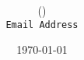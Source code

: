\documentclass[11pt,twocolumn]{report}
\title{\subjectcode{} \doctitle{}\\\large{\institution{}}}
\author{\name{} (\studentnumber{}) \\
\texttt{Email Address}}
\date{\today}
\begin{document}
\maketitle

\begin{abstract}

\lipsum[1]

\end{abstract}


 

\onecolumn
\nocite{*}



\restoregeometry


\end{document}
